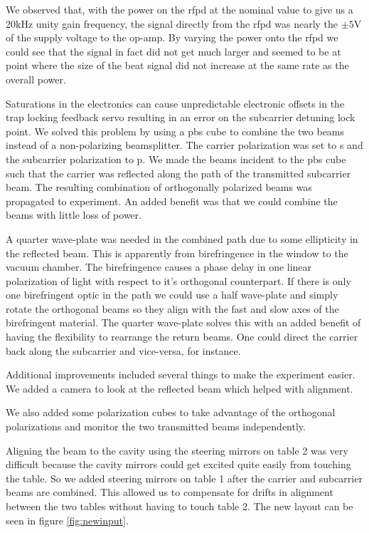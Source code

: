 We observed that, with the power on the \ac{rfpd} at the nominal value to give
us a 20kHz unity gain frequency, the signal directly from the \ac{rfpd} was
nearly the $\pm 5\mathrm{V}$ of the supply voltage to the op-amp.
By varying the power onto the \ac{rfpd} we could see that the signal in
fact did not get much larger and seemed to be at point where the size of the
beat signal did not increase at the same rate as the overall power.

Saturations in the electronics can cause unpredictable electronic
offsets in the trap locking feedback servo
resulting in an error on the subcarrier detuning lock point.
We solved this problem by using a \ac{pbs} cube to combine the two beams
instead of a non-polarizing beamsplitter.
The carrier polarization was set to s and the subcarrier polarization to p.
We made the beams incident to the \ac{pbs} cube such that the carrier was
reflected along the path of the transmitted subcarrier beam.
The resulting combination of orthogonally polarized beams was propagated
to experiment.
An added benefit was that we could combine the beams with little loss of
power.

A quarter wave-plate was needed in the combined path due to some ellipticity
in the reflected beam.
This is apparently from birefringence in the window to the vacuum chamber.
The birefringence causes a phase delay in one linear polarization of light
with respect to it's orthogonal counterpart.
If there is only one birefringent optic in the path we could use a
half wave-plate and simply rotate the orthogonal beams so they align with
the fast and slow axes of the birefringent material.
The quarter wave-plate solves this with an added benefit of having the
flexibility to rearrange the return beams. One could direct the carrier
back along the subcarrier and vice-versa, for instance.

Additional improvements included several things to make the experiment easier.
We added a camera to look at the reflected beam which helped with alignment.

We also added some polarization cubes to take advantage of the orthogonal
polarizations and monitor the two transmitted beams independently.

Aligning the beam to the cavity using the steering mirrors on table 2 was very
difficult because the cavity mirrors could get excited quite easily from
touching the table.
So we added steering mirrors on table 1 after the carrier and subcarrier
beams are combined. This allowed us to compensate for drifts in alignment
between the two tables without having to touch table 2.
The new layout can be seen in figure \ref{fig:newinput}.

